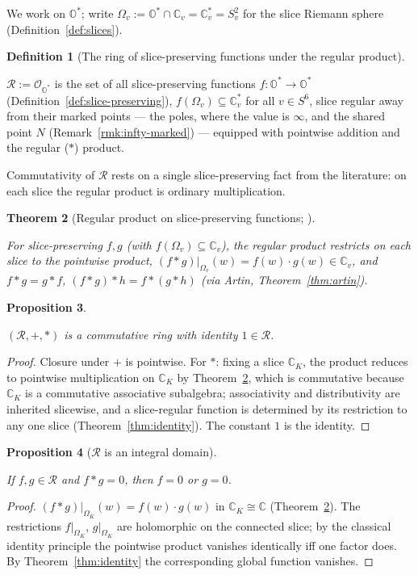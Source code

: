 \documentclass[11pt]{article}
\newcommand{\OO}{\mathbb{O}}
\newcommand{\CC}{\mathbb{C}}
\newcommand{\Ostar}{\OO^{*}}
\providecommand{\lean}[1]{}
\providecommand{\uses}[1]{}
\theoremstyle{plain}
\newtheorem{theorem}{Theorem}[section]
\newtheorem{proposition}[theorem]{Proposition}
\theoremstyle{definition}
\newtheorem{definition}[theorem]{Definition}
\theoremstyle{remark}
\begin{document}
We work on $\Ostar$; write $\Omega_v:=\Ostar\cap\CC_v=\CC_v^{*}=S^2_v$ for the slice
Riemann sphere (Definition~\ref{def:slices}).

\begin{definition}[The ring of slice-preserving functions under the regular product]\label{def:R}
\lean{StemRing}
\uses{def:slice-preserving, def:slices}
$\mathcal R:=\mathcal O_{\Ostar}$ is the set of all slice-preserving functions
$f:\Ostar\to\Ostar$ (Definition~\ref{def:slice-preserving}),
$f(\Omega_v)\subseteq\CC_v^{*}$ for all $v\in S^6$, slice regular away from their
marked points --- the poles, where the value is $\infty$, and the shared point $N$
(Remark~\ref{rmk:infty-marked}) --- equipped with pointwise addition and the regular
($\ast$) product.
\end{definition}

Commutativity of $\mathcal R$ rests on a single slice-preserving fact from the literature: on each
slice the regular product is ordinary multiplication.

\begin{theorem}[Regular product on slice-preserving functions; {\cite[Rem.~2.11]{Wang}}]\label{thm:wang}
\uses{thm:artin, def:R}
For slice-preserving $f,g$ (with $f(\Omega_v)\subseteq\CC_v$), the regular product
restricts on each slice to the pointwise product, $(f\ast g)|_{\Omega_v}(w)=f(w)\cdot
g(w)\in\CC_v$, and $f\ast g=g\ast f$, $(f\ast g)\ast h=f\ast(g\ast h)$ (via Artin,
Theorem~\ref{thm:artin}).
\end{theorem}

\begin{proposition}\label{prop:R-comm-ring}
\lean{StemRing}
\uses{thm:wang, thm:identity, def:R}
$(\mathcal R,+,\ast)$ is a commutative ring with identity $1\in\mathcal R$.
\end{proposition}
\begin{proof}
Closure under $+$ is pointwise. For $\ast$: fixing a slice $\CC_K$, the product
reduces to pointwise multiplication on $\CC_K$ by Theorem~\ref{thm:wang}, which is
commutative because $\CC_K$ is a commutative associative subalgebra; associativity
and distributivity are inherited slicewise, and a slice-regular function is
determined by its restriction to any one slice (Theorem~\ref{thm:identity}). The
constant $1$ is the identity.
\end{proof}

\begin{proposition}[$\mathcal R$ is an integral domain]\label{prop:R-domain}
\lean{StemRing.eq_zero_or_eq_zero_of_mul_eq_zero}
\uses{thm:wang, thm:identity}
If $f,g\in\mathcal R$ and $f\ast g=0$, then $f=0$ or $g=0$.
\end{proposition}
\begin{proof}
$(f\ast g)|_{\Omega_K}(w)=f(w)\cdot g(w)$ in $\CC_K\cong\CC$
(Theorem~\ref{thm:wang}). The restrictions $f|_{\Omega_K}$, $g|_{\Omega_K}$ are
holomorphic on the connected slice; by the classical identity principle the pointwise
product vanishes identically iff one factor does. By Theorem~\ref{thm:identity} the
corresponding global function vanishes.
\end{proof}
\end{document}
